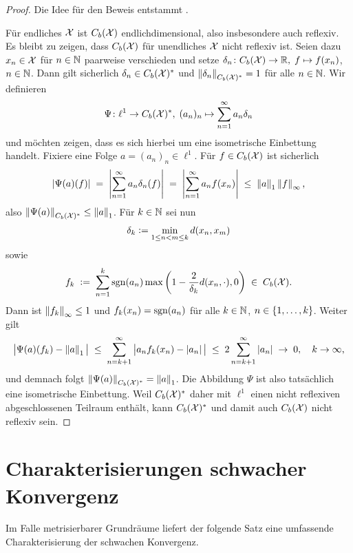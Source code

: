 \documentclass[../thesis/thesis.tex]{subfiles}
\begin{document}
	\begin{proof}
		Die Idee für den Beweis entstammt \cite{Martin.2019}.
		
		Für endliches $\mathcal{X}$ ist $C_b(\mathcal{X})$ endlichdimensional, also insbesondere auch reflexiv. 
		Es bleibt zu zeigen, dass $C_b(\mathcal{X})$ für unendliches $\mathcal{X}$ nicht reflexiv ist. Seien dazu $x_n \in \mathcal{X}$ für $n \in \mathbb{N}$ paarweise verschieden und setze
		$\delta_n \colon C_b(\mathcal{X}) \to \mathbb{R}, \; f \mapsto f(x_n) $, $n \in \mathbb{N}$. Dann gilt sicherlich $\delta_n \in C_b(\mathcal{X})^\ast$ und $\left\lVert\delta_n\right\rVert_{C_b(\mathcal{X})^\ast} = 1$ für alle $n \in \mathbb{N}$.
		Wir definieren
		\[ \Psi \colon \ell^1 \to C_b(\mathcal{X})^\ast, \; (a_n)_n \mapsto \sum_{n=1}^{\infty} a_n \delta_n  \]
		und möchten zeigen, dass es sich hierbei um eine isometrische Einbettung handelt. Fixiere eine Folge $a = (a_n)_n \in \ell^1$. Für $f \in C_b(\mathcal{X})$ ist sicherlich
		\[ \left| \Psi(a)(f) \right| \; = \; \left| \sum_{n=1}^{\infty} a_n \delta_n(f) \right| \; = \; \left| \sum_{n=1}^{\infty} a_n f(x_n) \right| \; \leq \; \left\lVert a\right\rVert_1 \left\lVert f\right\rVert_{\infty} \text{,} \]
		also $\left\lVert\Psi(a)\right\rVert_{C_b(\mathcal{X})^\ast} \leq \left\lVert a\right\rVert_1$. Für $k \in \mathbb{N}$ sei nun 
		\[\delta_k \vcentcolon = \min_{1 \leq n < m \leq k} d(x_n, x_m)\] 
		sowie
		\[ f_k \; \vcentcolon = \; \sum_{n=1}^{k} \mathrm{sgn}(a_n) \max \left( 1 - \frac{2}{\delta_k} d(x_n, \cdot), 0 \right) \; \in \; C_b(\mathcal{X}) \text{.} \]
		Dann ist $\left\lVert f_k\right\rVert_{\infty} \leq 1$ und $f_k(x_n) = \mathrm{sgn}(a_n)$ für alle $k \in \mathbb{N}$, $n \in \left\{1,\dots,k\right\}$. Weiter gilt
		\[ \big| \Psi(a)(f_k) - \left\lVert a\right\rVert_1 \big| \; \leq \; \sum_{n=k+1}^{\infty} \big| a_n f_k(x_n) - \left| a_n \right| \big| 
		\; \leq \; 2 \sum_{n=k+1}^{\infty} \left| a_n \right| \; \to \; 0, \quad k \to \infty \text{,} \]
		und demnach folgt $\left\lVert\Psi(a)\right\rVert_{C_b(\mathcal{X})^\ast} = \left\lVert a\right\rVert_1$. Die Abbildung $\Psi$ ist also tatsächlich eine isometrische Einbettung. Weil $C_b(\mathcal{X})^\ast$ daher mit $\ell^1$ einen nicht reflexiven
		abgeschlossenen Teilraum enthält, kann $C_b(\mathcal{X})^\ast$ und damit auch $C_b(\mathcal{X})$ nicht reflexiv sein.
	\end{proof}
	
	\section{Charakterisierungen schwacher Konvergenz}
	\label{subsec:charakterisierung_schwache_konvergenz}
	
	Im Falle metrisierbarer Grundräume liefert der folgende Satz eine umfassende Charakterisierung der schwachen Konvergenz.
	
\end{document}
